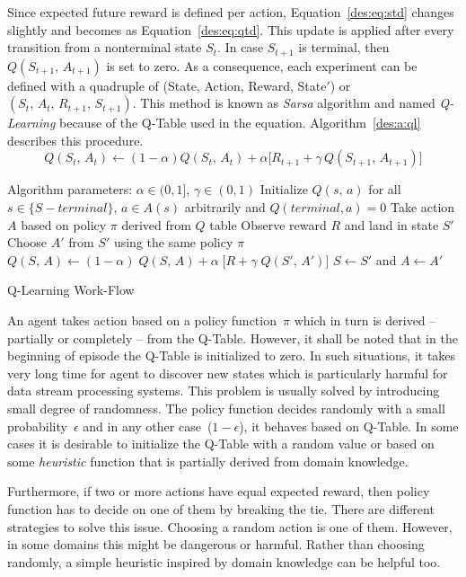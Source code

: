 Since expected future reward is defined per action, Equation~\ref{des:eq:std} changes slightly and becomes as Equation~\ref{des:eq:qtd}. This update is applied after every transition from a nonterminal state $S_t$. In case $S_{t+1}$ is terminal, then $Q(S_{t+1},\,A_{t+1})$ is set to zero. As a consequence, each experiment can be defined with a quadruple of (State, Action, Reward, State$'$) or $(S_{t},\,A_{t},\,R_{t+1},\,S_{t+1})$. This method is known as \emph{Sarsa} algorithm and named \emph{Q-Learning} because of the Q-Table used in the equation. Algorithm~\ref{des:a:ql} describes this procedure.
\begin{equation}
Q(S_t,\,A_t) \longleftarrow (1-\alpha)Q(S_t,\,A_t) + \alpha\big[R_{t+1} + \gamma\,Q(S_{t+1},\,A_{t+1})\big]
\label{des:eq:qtd}
\end{equation}
\begin{algorithm}[H]
	\DontPrintSemicolon
	Algorithm parameters: $\alpha \in (0,1]$, $\gamma \in (0,1)$\;
	Initialize $Q(s,\,a)$ for all $s \in \{S - terminal\}$, $a \in A(s)$ arbitrarily and $Q(terminal,a) = 0$\;
	 {
		Take action $A$ based on policy $\pi$ derived from $Q$ table\;
		Observe reward $R$ and land in state $S'$\;
		Choose $A'$ from $S'$ using the same policy $\pi$\;
		$Q(S,\,A) \gets (1-\alpha)\;Q(S,\,A) + \alpha\;\big[R + \gamma\;Q(S',\,A')\big]$\;
		$S \gets S'$ and $A \gets A'$\;
	}
	\caption[Q-Learning Work-Flow]{Q-Learning Work-Flow\footnotemark}
	\label{des:a:ql}
\end{algorithm}

An agent takes action based on a policy function~$\pi$ which in turn is derived -- partially or completely -- from the Q-Table. However, it shall be noted that in the beginning of episode the Q-Table is initialized to zero. In such situations, it takes very long time for agent to discover new states which is particularly harmful for data stream processing systems. This problem is usually solved by introducing small degree of randomness. The policy function decides randomly with a small probability~$\epsilon$ and in any other case~($1-\epsilon$), it behaves based on Q-Table. In some cases it is desirable to initialize the Q-Table with a random value or based on some \emph{heuristic} function that is partially derived from domain knowledge.

Furthermore, if two or more actions have equal expected reward, then policy function has to decide on one of them by breaking the tie. There are different strategies to solve this issue. Choosing a random action is one of them. However, in some domains this might be dangerous or harmful. Rather than choosing randomly, a simple heuristic inspired by domain knowledge can be helpful too.
